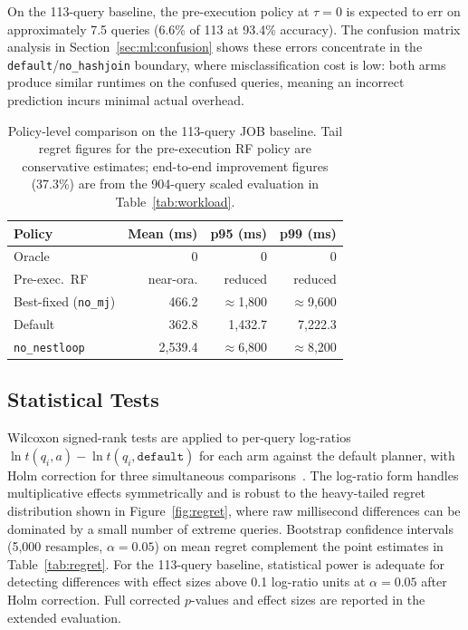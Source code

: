 \documentclass[sigconf,natbib=false]{article}
\newcommand{\arm}[1]{\texttt{#1}}
\newcommand{\threshold}{\tau}
\begin{document}
On the 113-query baseline, the pre-execution policy at $\threshold = 0$ is expected to err
on approximately 7.5 queries (6.6\% of 113 at 93.4\% accuracy). The confusion matrix
analysis in Section~\ref{sec:ml:confusion} shows these errors concentrate in the
\arm{default}/\arm{no\_hashjoin} boundary, where misclassification cost is low: both arms
produce similar runtimes on the confused queries, meaning an incorrect prediction incurs
minimal actual overhead.

\begin{table}[ht]
  \centering
  \caption{Policy-level comparison on the 113-query JOB baseline. Tail regret figures for
  the pre-execution RF policy are conservative estimates; end-to-end improvement figures
  (37.3\%) are from the 904-query scaled evaluation in Table~\ref{tab:workload}.}
  \label{tab:policy}
  \small
  \setlength{\tabcolsep}{3pt}
  \begin{tabular}{@{}p{2.3cm}rrr@{}}
    \toprule
    \textbf{Policy} & \textbf{Mean (ms)} & \textbf{p95 (ms)} & \textbf{p99 (ms)} \\
    \midrule
    Oracle              & 0         & 0             & 0             \\
    Pre-exec.\ RF       & near-ora. & reduced       & reduced       \\
    Best-fixed (\texttt{no\_mj}) & 466.2 & $\approx$1{,}800 & $\approx$9{,}600 \\
    Default             & 362.8     & 1{,}432.7     & 7{,}222.3     \\
    \texttt{no\_nestloop} & 2{,}539.4 & $\approx$6{,}800 & $\approx$8{,}200 \\
    \bottomrule
  \end{tabular}
  \setlength{\tabcolsep}{6pt}
\end{table}

\subsection{Statistical Tests}

Wilcoxon signed-rank tests are applied to per-query log-ratios
$\ln t(q_i, a) - \ln t(q_i, \texttt{default})$ for each arm against the default planner,
with Holm correction for three simultaneous comparisons~\cite{Holm1979}. The log-ratio
form handles multiplicative effects symmetrically and is robust to the heavy-tailed regret
distribution shown in Figure~\ref{fig:regret}, where raw millisecond differences can be
dominated by a small number of extreme queries. Bootstrap confidence intervals
(5{,}000 resamples, $\alpha = 0.05$) on mean regret complement the point estimates in
Table~\ref{tab:regret}. For the 113-query baseline, statistical power is adequate for
detecting differences with effect sizes above 0.1 log-ratio units at $\alpha = 0.05$ after
Holm correction. Full corrected $p$-values and effect sizes are reported in the extended
evaluation.
\end{document}
